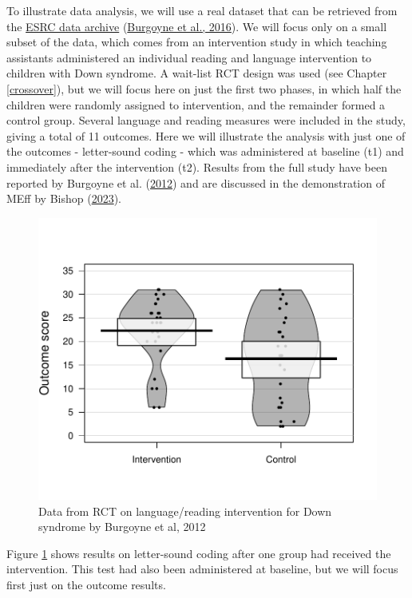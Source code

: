 \documentclass{krantz}
\begin{document}
To illustrate data analysis, we will use a real dataset that can be retrieved from the \href{https://reshare.ukdataservice.ac.uk/852291/}{ESRC data archive} (\protect\hyperlink{ref-burgoyne2016}{Burgoyne et al., 2016}). We will focus only on a small subset of the data, which comes from an intervention study in which teaching assistants administered an individual reading and language intervention to children with Down syndrome. A wait-list RCT design was used (see Chapter \ref{crossover}), but we will focus here on just the first two phases, in which half the children were randomly assigned to intervention, and the remainder formed a control group. Several language and reading measures were included in the study, giving a total of 11 outcomes. Here we will illustrate the analysis with just one of the outcomes - letter-sound coding - which was administered at baseline (t1) and immediately after the intervention (t2). Results from the full study have been reported by Burgoyne et al. (\protect\hyperlink{ref-burgoyne2012}{2012}) and are discussed in the demonstration of MEff by Bishop (\protect\hyperlink{ref-bishop2023b}{2023}).

\begin{center}
\begin{figure}
\includegraphics[width=0.75\linewidth]{images_bw/pirateRCT} \caption{Data from RCT on language/reading intervention for Down syndrome by Burgoyne et al, 2012}\label{fig:pirateRCT}
\end{figure}
\end{center}

Figure \ref{fig:pirateRCT} shows results on letter-sound coding after one group had received the intervention. This test had also been administered at baseline, but we will focus first just on the outcome results.
\end{document}
